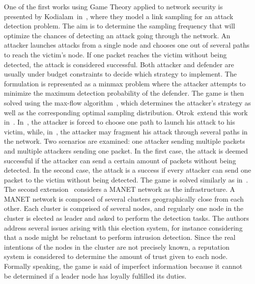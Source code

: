  One of the first works using Game Theory applied to network security is presented by Kodialam~\etal in~\cite{MuraliKodialam2003}, where they model a link sampling for an attack detection problem.
 The aim is to determine the sampling frequency that will optimize the chances of detecting an attack going through the network.
 An attacker launches attacks from a single node and chooses one out of several paths to reach the victim's node.
 If one packet reaches the victim without being detected, the attack is considered successful.
 Both attacker and defender are usually under budget constraints to decide which strategy to implement.
 The formulation is represented as a minmax problem where the attacker attempts to minimize the maximum detection probability of the defender.
 The game is then solved using the max-flow algorithm~\cite{maxflow}, which determines the attacker's strategy as well as the corresponding optimal sampling distribution.
 Otrok~\etal extend this work in~\cite{otrok1,otrok2}.
 In~\cite{MuraliKodialam2003}, the attacker is forced to choose one path to launch his attack to his victim, while, in~\cite{otrok1}, the attacker may fragment his attack through several paths in the network.
 Two scenarios are examined: one attacker sending multiple packets and multiple attackers sending one packet.
 In the first case, the attack is deemed successful if the attacker can send a certain amount of packets without being detected.
 In the second case, the attack is a success if every attacker can send one packet to the victim without being detected.
 The game is solved similarly as in~\cite{MuraliKodialam2003}.
 The second extension~\cite{otrok2} considers a MANET network as the infrastructure.
 A MANET network is composed of several clusters geographically close from each other.
 Each cluster is comprised of several nodes, and regularly one node in the cluster is elected as leader and asked to perform the detection tasks. The authors address several issues arising with this election system, for instance considering that a node might be reluctant to perform intrusion detection.
 Since the real intentions of the nodes in the cluster are not precisely known, a reputation system is considered to determine the amount of trust given to each node.
 Formally speaking, the game is said of imperfect information because it cannot be determined if a leader node has loyally fulfilled its duties.
 
